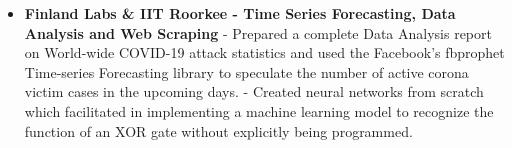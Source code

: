\documentclass{article}
\begin{document}
\begin{itemize}
{          }{}

    \item{\textbf{\large{Finland Labs \& IIT Roorkee - Time Series Forecasting, Data Analysis and Web Scraping}}}
          \newline
          \textmd{- Prepared a complete Data Analysis report on World-wide COVID-19 attack statistics and used the Facebook's fbprophet Time-series Forecasting library to speculate the number of active corona victim cases in the upcoming days.}\newline
          \textmd{- Created neural networks from scratch which facilitated in implementing a machine learning model to recognize the function of an XOR gate without explicitly being programmed.}%


\end{itemize}
\end{document}

